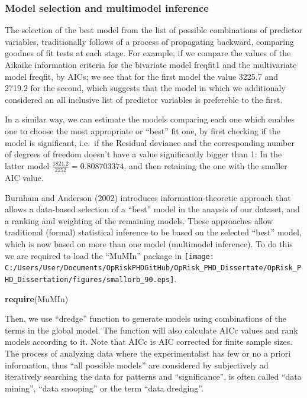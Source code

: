 \documentclass[]{DissertateUSU}
\newenvironment{Shaded}{\begin{snugshade}}{\end{snugshade}}
\newcommand{\KeywordTok}[1]{\textcolor[rgb]{0.13,0.29,0.53}{\textbf{#1}}}
\newcommand{\NormalTok}[1]{#1}
\begin{document}
\doublespacing

\singlespacing

\doublespacing

\subsubsection{Model selection and multimodel inference}

The selection of the best model from the list of possible combinations
of predictor variables, traditionally follows of a process of
propagating backward, comparing goodnes of fit tests at each stage. For
example, if we compare the values of the Aikaike information criteria
for the bivariate model freqfit1 and the multivariate model freqfit, by
AICs; we see that for the first model the value 3225.7 and 2719.2 for
the second, which suggests that the model in which we additionaly
considered an all inclusive list of predictor variables is prefereble to
the first. \medskip

In a similar way, we can estimate the models comparing each one which
enables one to choose the most appropriate or ``best'' fit one, by first
checking if the model is significant, i.e.~if the Residual deviance and
the corresponding number of degrees of freedom doesn't have a value
significantly bigger than 1: In the latter model
\(\frac{1821.2}{2252} = 0.808703374\), and then retaining the one with
the smaller AIC value.\medskip 

Burnham and Anderson (2002) introduces information-theoretic approach
that allows a data-based selection of a ``best'' model in the anaysis of
our dataset, and a ranking and weighting of the remaining models. These
approaches allow traditional (formal) statistical inference to be based
on the selected ``best'' model, which is now based on more than one
model (multimodel inference). To do this we are required to load the
``MuMIn'' package in
\texttt{[image: C:/Users/User/Documents/OpRiskPHDGitHub/OpRisk\_PHD\_Dissertate/OpRisk\_PHD\_Dissertation/figures/smallorb\_90.eps]}.
\medskip

\singlespacing

\begin{Shaded}
\begin{Highlighting}[]
\KeywordTok{require}\NormalTok{(MuMIn)}
\end{Highlighting}
\end{Shaded}

\doublespacing

Then, we use ``dredge'' function to generate models using combinations
of the terms in the global model. The function will also calculate AICc
values and rank models according to it. Note that AICc is AIC corrected
for finite sample sizes. The process of analyzing data where the
experimentalist has few or no a priori information, thus ``all possible
models'' are considered by subjectively ad iteratively searching the
data for patterns and ``significance'', is often called ``data mining'',
``data snooping'' or the term ``data dredging''.
\end{document}

